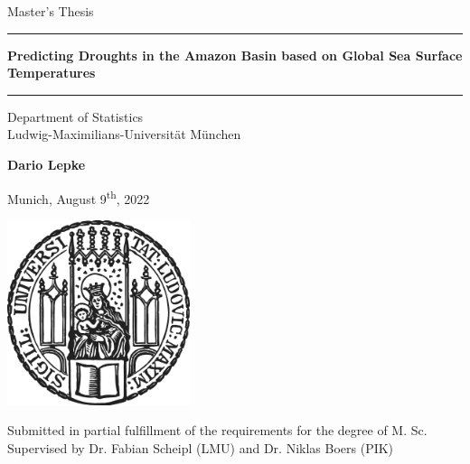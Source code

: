 \begin{titlepage}
\begin{center}

\LARGE
Master's Thesis
    
\vspace{0.5cm}
      
\rule{\textwidth}{1.5pt}
\LARGE
\textbf{Predicting Droughts in the Amazon Basin based on Global Sea Surface Temperatures}
\rule{\textwidth}{1.5pt}
   
\vspace{0.5cm}
      
\large
Department of Statistics \\
Ludwig-Maximilians-Universität München 

\vfill

\Large
\textbf{Dario Lepke}

\vfill

\large
Munich, August 9\textsuperscript{th}, 2022
      
\vfill

\includegraphics[width = 0.4\textwidth]{sigillum.png}

\vfill

\normalsize
Submitted in partial fulfillment of the requirements for the degree of M. Sc.
\\

Supervised by Dr. Fabian Scheipl (LMU) and Dr. Niklas Boers (PIK)

\end{center}
\end{titlepage}

% 